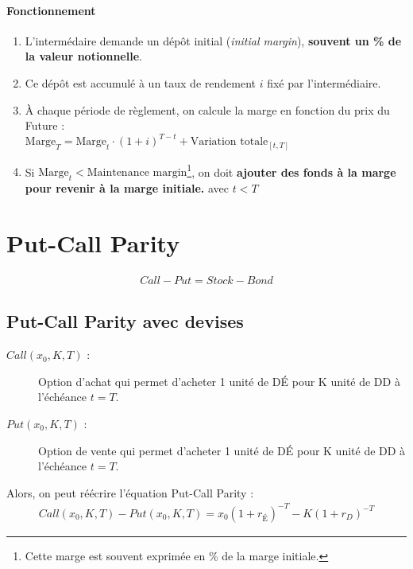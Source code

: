 \documentclass[10pt, french]{article}
\begin{document}
\begin{multicols*}{2}
\paragraph{Fonctionnement}
\begin{enumerate}
\item L'intermédaire demande un dépôt initial (\textit{initial margin}), \textbf{souvent un \% de la valeur notionnelle}.
\item Ce dépôt est accumulé à un taux de rendement $i$ fixé par l'intermédiaire.
\item À chaque période de règlement, on calcule la marge en fonction du prix du Future : \\
$\text{Marge}_T = \text{Marge}_{t} \cdot (1+i)^{T-t} + \text{Variation totale}_{[t,T]}$
\item Si $\text{Marge}_t  < \text{Maintenance margin}$\footnote{Cette marge est souvent exprimée en \% de la marge initiale.}, on doit \textbf{ajouter des fonds à la marge pour revenir à la marge initiale.}
avec $t < T$
\end{enumerate}



\setcounter{section}{8}
\section{Put-Call Parity}
\begin{align*}
Call - Put = Stock - Bond
\end{align*}

\subsection*{Put-Call Parity avec devises}
\begin{description}
\item[$Call(x_0, K, T)$ : ] Option d'achat qui permet d'acheter 1 unité de DÉ pour K unité de DD à l'échéance $t = T$.
\item[$Put(x_0, K, T)$ : ] Option de vente qui permet d'acheter 1 unité de DÉ pour K unité de DD à l'échéance $t = T$.
\end{description}
Alors, on peut réécrire l'équation Put-Call Parity :
\begin{align*}
Call(x_0, K,T) - Put(x_0, K, T) = x_0(1+r_{É})^{-T} - K(1+r_D)^{-T}
\end{align*}



\end{multicols*}
\end{document}
